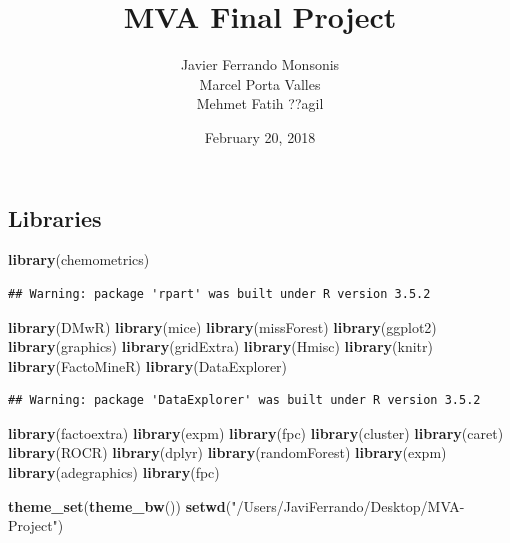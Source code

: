 \documentclass[]{article}
\title{MVA Final Project}
\author{Javier Ferrando Monsonis \\ Marcel Porta Valles \\ Mehmet Fatih ??agil}
\date{February 20, 2018}
\newenvironment{Shaded}{\begin{snugshade}}{\end{snugshade}}
\newcommand{\KeywordTok}[1]{\textcolor[rgb]{0.13,0.29,0.53}{\textbf{#1}}}
\newcommand{\StringTok}[1]{\textcolor[rgb]{0.31,0.60,0.02}{#1}}
\newcommand{\NormalTok}[1]{#1}
\begin{document}
\maketitle

\subsection{Libraries}\label{libraries}

\begin{Shaded}
\begin{Highlighting}[]
\KeywordTok{library}\NormalTok{(chemometrics)}
\end{Highlighting}
\end{Shaded}

\begin{verbatim}
## Warning: package 'rpart' was built under R version 3.5.2
\end{verbatim}

\begin{Shaded}
\begin{Highlighting}[]
\KeywordTok{library}\NormalTok{(DMwR)}
\KeywordTok{library}\NormalTok{(mice)}
\KeywordTok{library}\NormalTok{(missForest)}
\KeywordTok{library}\NormalTok{(ggplot2)}
\KeywordTok{library}\NormalTok{(graphics)}
\KeywordTok{library}\NormalTok{(gridExtra)}
\KeywordTok{library}\NormalTok{(Hmisc)}
\KeywordTok{library}\NormalTok{(knitr)}
\KeywordTok{library}\NormalTok{(FactoMineR)}
\KeywordTok{library}\NormalTok{(DataExplorer)}
\end{Highlighting}
\end{Shaded}

\begin{verbatim}
## Warning: package 'DataExplorer' was built under R version 3.5.2
\end{verbatim}

\begin{Shaded}
\begin{Highlighting}[]
\KeywordTok{library}\NormalTok{(factoextra)}
\KeywordTok{library}\NormalTok{(expm)}
\KeywordTok{library}\NormalTok{(fpc)}
\KeywordTok{library}\NormalTok{(cluster)}
\KeywordTok{library}\NormalTok{(caret)}
\KeywordTok{library}\NormalTok{(ROCR)}
\KeywordTok{library}\NormalTok{(dplyr)}
\KeywordTok{library}\NormalTok{(randomForest)}
\KeywordTok{library}\NormalTok{(expm)}
\KeywordTok{library}\NormalTok{(adegraphics)}
\KeywordTok{library}\NormalTok{(fpc)}

\KeywordTok{theme_set}\NormalTok{(}\KeywordTok{theme_bw}\NormalTok{())}
\KeywordTok{setwd}\NormalTok{(}\StringTok{"/Users/JaviFerrando/Desktop/MVA-Project"}\NormalTok{)}
\end{Highlighting}
\end{Shaded}
\end{document}
